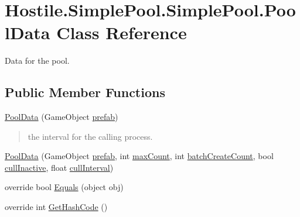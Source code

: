 \hypertarget{class_hostile_1_1_simple_pool_1_1_simple_pool_1_1_pool_data}{\section{Hostile.\-Simple\-Pool.\-Simple\-Pool.\-Pool\-Data Class Reference}
\label{class_hostile_1_1_simple_pool_1_1_simple_pool_1_1_pool_data}
}


Data for the pool.  


\subsection*{Public Member Functions}
\begin{DoxyCompactItemize}
\item 
\hyperlink{class_hostile_1_1_simple_pool_1_1_simple_pool_1_1_pool_data_ab4f4d52cc8cb6a59c0fdd6daa9c9cdf2}{Pool\-Data} (Game\-Object \hyperlink{class_hostile_1_1_simple_pool_1_1_simple_pool_1_1_pool_data_a07ccce81192461026b94dc8f9aa8d818}{prefab})
\begin{DoxyCompactList}\small\item\em \begin{quotation}
the interval for the calling process. \end{quotation}
\end{DoxyCompactList}\item 
\hyperlink{class_hostile_1_1_simple_pool_1_1_simple_pool_1_1_pool_data_abcd63a91c1b5673604ac149779b142ed}{Pool\-Data} (Game\-Object \hyperlink{class_hostile_1_1_simple_pool_1_1_simple_pool_1_1_pool_data_a07ccce81192461026b94dc8f9aa8d818}{prefab}, int \hyperlink{class_hostile_1_1_simple_pool_1_1_simple_pool_1_1_pool_data_a184e81d595ad9455d412f67162c7b1c9}{max\-Count}, int \hyperlink{class_hostile_1_1_simple_pool_1_1_simple_pool_1_1_pool_data_aa54efc2b91d459428c230443d6ccac7b}{batch\-Create\-Count}, bool \hyperlink{class_hostile_1_1_simple_pool_1_1_simple_pool_1_1_pool_data_a060629295fb510de44ccd4e7ab0a41f1}{cull\-Inactive}, float \hyperlink{class_hostile_1_1_simple_pool_1_1_simple_pool_1_1_pool_data_a174300eacbde77efbf917eff6e209def}{cull\-Interval})
\item 
override bool \hyperlink{class_hostile_1_1_simple_pool_1_1_simple_pool_1_1_pool_data_aaf16cf568e44f193ae721b481185310e}{Equals} (object obj)
\item 
override int \hyperlink{class_hostile_1_1_simple_pool_1_1_simple_pool_1_1_pool_data_a3126d28f0ed3f68d86a28b1df2753715}{Get\-Hash\-Code} ()
\end{DoxyCompactItemize}
